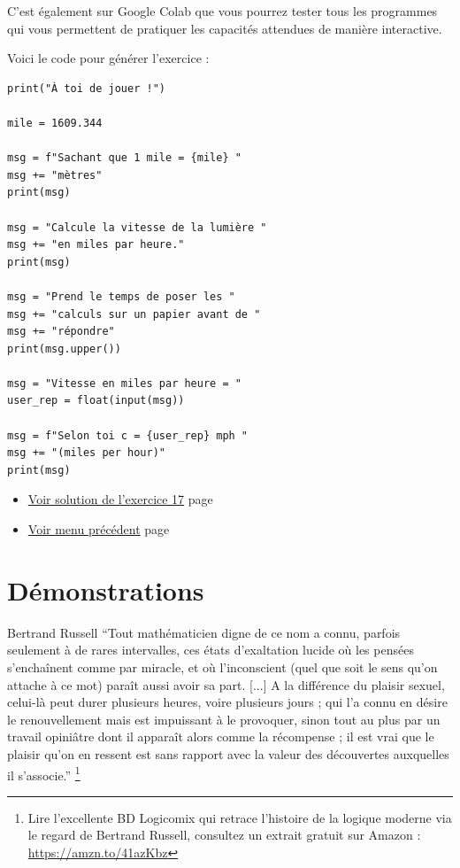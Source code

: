 \documentclass[a4paper,11pt]{book}
\begin{document}
C'est également sur Google Colab que vous pourrez tester tous les
programmes qui vous permettent de pratiquer les capacités attendues
de manière interactive.

\newpage

Voici le code pour générer l'exercice :

\begin{verbatim}
print("À toi de jouer !")

mile = 1609.344

msg = f"Sachant que 1 mile = {mile} "
msg += "mètres"
print(msg)

msg = "Calcule la vitesse de la lumière "
msg += "en miles par heure."
print(msg)

msg = "Prend le temps de poser les "
msg += "calculs sur un papier avant de "
msg += "répondre"
print(msg.upper())

msg = "Vitesse en miles par heure = "
user_rep = float(input(msg))

msg = f"Selon toi c = {user_rep} mph "
msg += "(miles per hour)"
print(msg)
\end{verbatim}

\newpage

\begin{itemize}
\item \hyperref[orgef40258]{Voir solution de l'exercice 17}
page~\pageref{page:sec9.4.1sol17}
\item \hyperref[org7e69f0d]{Voir menu précédent}
page~\pageref{page:capacity5-menu}
\end{itemize}


\clearpage


\part{Démonstrations}
\label{sec:org0d2ae5c}
\label{org08a4120}
\label{page:sec4proofs}

\begin{myquote}{Bertrand Russell}
\enquote{Tout mathématicien digne de ce nom a connu, parfois seulement à de
rares intervalles, ces états d’exaltation lucide où les pensées
s’enchaînent comme par miracle, et où l’inconscient (quel que soit
le sens qu’on attache à ce mot) paraît aussi avoir sa part. [...] A
la différence du plaisir sexuel, celui-là peut durer plusieurs
heures, voire plusieurs jours ; qui l’a connu en désire le
renouvellement mais est impuissant à le provoquer, sinon tout au
plus par un travail opiniâtre dont il apparaît alors comme la
récompense ; il est vrai que le plaisir qu’on en ressent est sans
rapport avec la valeur des découvertes auxquelles il s’associe.}
\footnote{Lire l'excellente BD Logicomix qui retrace l'histoire
de la logique moderne via le regard de Bertrand Russell, consultez un
extrait gratuit sur Amazon : \url{https://amzn.to/41azKbz}}
\end{myquote}
\end{document}
